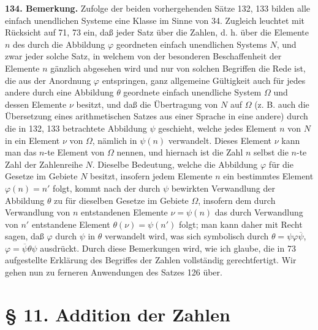 \documentclass[11pt]{article}
\begin{document}
\noindent\textbf{134. Bemerkung.} Zufolge der beiden vorhergehenden Sätze 132, 133 bilden alle einfach unendlichen Systeme eine Klasse im Sinne von 34. Zugleich leuchtet mit Rücksicht auf 71, 73 ein, daß jeder Satz über die Zahlen, d. h. über die Elemente $n$ des durch die Abbildung $\varphi$ geordneten einfach unendlichen Systems $N$, und zwar jeder solche Satz, in welchem von der besonderen Beschaffenheit der Elemente $n$ gänzlich abgesehen wird und nur von solchen Begriffen die Rede ist, die aus der Anordnung $\varphi$ entspringen, ganz allgemeine Gültigkeit auch für jedes andere durch eine Abbildung $\theta$ geordnete einfach unendliche System $\Omega$ und dessen Elemente $\nu$ besitzt, und daß die Übertragung von $N$ auf $\Omega$ (z. B. auch die Übersetzung eines arithmetischen Satzes aus einer Sprache in eine andere) durch die in 132, 133 betrachtete Abbildung $\psi$ geschieht, welche jedes Element $n$ von $N$ in ein Element $\nu$ von $\Omega$, nämlich in $\psi(n)$ verwandelt. Dieses Element $\nu$ kann man das $n$-te Element von $\Omega$ nennen, und hiernach ist die Zahl $n$ selbst die $n$-te Zahl der Zahlenreihe $N$. Dieselbe Bedeutung, welche die Abbildung $\varphi$ für die Gesetze im Gebiete $N$ besitzt, insofern jedem Elemente $n$ ein bestimmtes Element $\varphi(n)=n'$ folgt, kommt nach der durch $\psi$ bewirkten Verwandlung der Abbildung $\theta$ zu für dieselben Gesetze im Gebiete $\Omega$, insofern dem durch Verwandlung von $n$ entstandenen Elemente $\nu=\psi(n)$ das durch Verwandlung von $n'$ entstandene Element $\theta(\nu)=\psi(n')$ folgt; man kann daher mit Recht sagen, daß $\varphi$ durch $\psi$ in $\theta$ verwandelt wird, was sich symbolisch durch $\theta=\psi\varphi\overline{\psi}$, $\varphi=\overline{\psi}\theta\psi$ ausdrückt. Durch diese Bemerkungen wird, wie ich glaube, die in 73 aufgestellte Erklärung des Begriffes der Zahlen vollständig gerechtfertigt. Wir gehen nun zu ferneren Anwendungen des Satzes 126 über.

\section*{\S{} 11. Addition der Zahlen}
\end{document}
